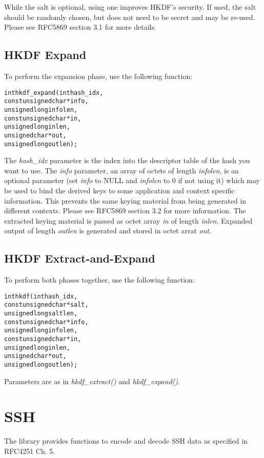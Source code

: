 \documentclass[synpaper]{book}
\newcommand{\mysection}[1]    %
	{                   %
	\section{#1}
   \markboth{\textsf{www.libtom.net}}{\thesection ~ {#1}}
	}
\begin{document}
While the salt is optional, using one improves HKDF's security. If used, the salt should be randomly chosen, but does not need to be secret and may be re-used. Please see RFC5869 section 3.1 for more details.

\subsection{HKDF Expand}
To perform the expansion phase, use the following function:

\begin{alltt}
int hkdf_expand(    int  hash_idx,
    const unsigned char *info,
          unsigned long  infolen,
    const unsigned char *in,
          unsigned long  inlen,
          unsigned char *out,
          unsigned long  outlen);
\end{alltt}

The \textit{hash\_idx} parameter is the index into the descriptor table of the hash you want to use.
The \textit{info} parameter, an array of octets of length \textit{infolen}, is an optional parameter (set \textit{info} to NULL and \textit{infolen} to 0 if not using it) which
may be used to bind the derived keys to some application and context specific information. This prevents the same keying material from being generated in different contexts. Please see RFC5869 section 3.2 for more information.
The extracted keying material is passed as octet array \textit{in} of length \textit{inlen}.  Expanded output of length \textit{outlen} is generated and stored in octet arrat \textit{out}.

\subsection{HKDF Extract-and-Expand}
To perform both phases together, use the following function:

\begin{alltt}
int hkdf(           int  hash_idx,
    const unsigned char *salt,
          unsigned long  saltlen,
    const unsigned char *info,
          unsigned long  infolen,
    const unsigned char *in,
          unsigned long  inlen,
          unsigned char *out,
          unsigned long  outlen);
\end{alltt}

Parameters are as in \textit{hkdf\_extract()} and \textit{hkdf\_expand()}.


\mysection{SSH}

The library provides functions to encode and decode SSH data as specified in RFC4251 Ch. 5.
\end{document}
